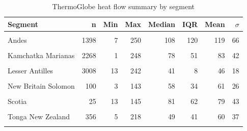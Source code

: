 \begin{table}

\caption{\label{tab:hfSummaryTable}ThermoGlobe heat flow summary by segment}
\centering
\begin{threeparttable}
\begin{tabular}[t]{lrrrrrrr}
\toprule
Segment & n & Min & Max & Median & IQR & Mean & $\sigma$\\
\midrule
\cellcolor{gray!6}{Alaska Aleutians} & \cellcolor{gray!6}{290} & \cellcolor{gray!6}{6} & \cellcolor{gray!6}{196} & \cellcolor{gray!6}{66} & \cellcolor{gray!6}{27} & \cellcolor{gray!6}{71} & \cellcolor{gray!6}{28}\\
Andes & 1398 & 7 & 250 & 108 & 120 & 119 & 66\\
\cellcolor{gray!6}{Central America} & \cellcolor{gray!6}{1441} & \cellcolor{gray!6}{8} & \cellcolor{gray!6}{250} & \cellcolor{gray!6}{89} & \cellcolor{gray!6}{123} & \cellcolor{gray!6}{110} & \cellcolor{gray!6}{67}\\
Kamchatka Marianas & 2268 & 1 & 248 & 78 & 51 & 83 & 42\\
\cellcolor{gray!6}{Kyushu Ryukyu} & \cellcolor{gray!6}{1895} & \cellcolor{gray!6}{3} & \cellcolor{gray!6}{250} & \cellcolor{gray!6}{76} & \cellcolor{gray!6}{42} & \cellcolor{gray!6}{84} & \cellcolor{gray!6}{42}\\
Lesser Antilles & 3008 & 13 & 242 & 41 & 8 & 46 & 18\\
\cellcolor{gray!6}{N Philippines} & \cellcolor{gray!6}{569} & \cellcolor{gray!6}{3} & \cellcolor{gray!6}{231} & \cellcolor{gray!6}{71} & \cellcolor{gray!6}{26} & \cellcolor{gray!6}{75} & \cellcolor{gray!6}{33}\\
New Britain Solomon & 100 & 3 & 143 & 58 & 34 & 61 & 26\\
\cellcolor{gray!6}{S Philippines} & \cellcolor{gray!6}{458} & \cellcolor{gray!6}{1} & \cellcolor{gray!6}{224} & \cellcolor{gray!6}{71} & \cellcolor{gray!6}{32} & \cellcolor{gray!6}{74} & \cellcolor{gray!6}{33}\\
Scotia & 25 & 13 & 145 & 81 & 62 & 79 & 43\\
\cellcolor{gray!6}{Sumatra Banda Sea} & \cellcolor{gray!6}{1415} & \cellcolor{gray!6}{1} & \cellcolor{gray!6}{247} & \cellcolor{gray!6}{59} & \cellcolor{gray!6}{63} & \cellcolor{gray!6}{67} & \cellcolor{gray!6}{42}\\
Tonga New Zealand & 356 & 5 & 218 & 49 & 41 & 60 & 37\\
\cellcolor{gray!6}{Vanuatu} & \cellcolor{gray!6}{137} & \cellcolor{gray!6}{1} & \cellcolor{gray!6}{223} & \cellcolor{gray!6}{61} & \cellcolor{gray!6}{62} & \cellcolor{gray!6}{80} & \cellcolor{gray!6}{52}\\

\end{tabular}
\end{threeparttable}
\end{table}
